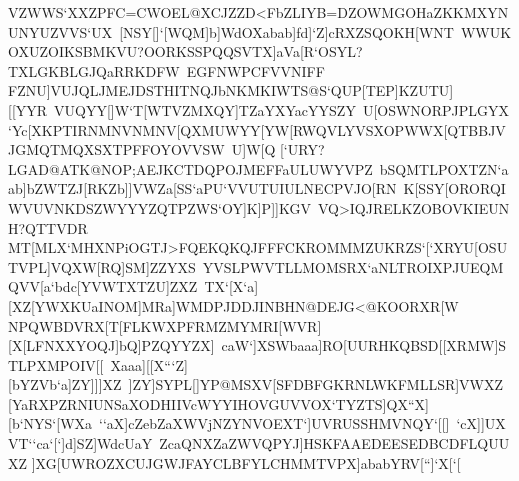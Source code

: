 {{ \hbox{VZWWS`XXZPFC=CWOEL@XCJZZD<FbZLIYB=DZOWMGOHaZKKMXYNUNYUZVVS`UX%
 [NSY[]`[WQM]b]WdOXabab]fd]`Z]cRXZSQOKH[WNT%
 WWUKOXUZOIKSBMKVU?OORKSSPQQSVTX]aVa[R`OSYL?TXLGKBLGJQaRRKDFW%
 EGFNWPCFVVNIFF}
 \hbox{FZNU]VUJQLJMEJDSTHITNQJbNKMKIWTS@S`QUP[TEP]KZUTU][[YYR%
 VUQYY[]W`T[WTVZMXQY]TZaYXYacYYSZY%
 U[OSWNORPJPLGYX`Yc[XKPTIRNMNVNMNV[QXMUWYY[YW[RWQVLYVSXOPWWX[QTBBJVJGMQTMQXSXTPFFOYOVVSW%
 U]W[Q}
 \hbox{[`URY?LGAD@ATK@NOP;AEJKCTDQPOJMEFFaULUWYVPZ%
 bSQMTLPOXTZN`aab]bZWTZJ[RKZb]]VWZa[SS`aPU`VVUTUIULNECPVJO[RN%
 K[SSY[ORORQIWVUVNKDSZWYYYZQTPZWS`OY]K]P]]KGV%
 VQ>IQJRELKZOBOVKIEUNH?QTTVDR}
 \hbox{MT[MLX`MHXNPiOGTJ>FQEKQKQJFFFCKROMMMZUKRZS`[`XRYU[OSUTVPL]VQXW[RQ]SM]ZZYXS%
 YVSLPWVTLLMOMSRX`aNLTROIXPJUEQMQVV[a`bdc[YVWTXTZU]ZXZ%
 TX`[X`a][XZ[YWXKUaINOM]MRa]WMDPJDDJINBHN@DEJG<@KOORXR[W}
 \hbox{NPQWBDVRX[T[FLKWXPFRMZMYMRI[WVR][X[LFNXXYOQJ]bQ]PZQYYZX]%
 caW`]XSWbaaa]RO[UURHKQBSD[[XRMW]STLPXMPOIV[[%
 Xaaa][[X```Z][bYZVb`a]ZY]]]XZ%
 ]ZY]SYPL[]YP@MSXV[SFDBFGKRNLWKFMLLSR]VWXZ}
 \hbox{[YaRXPZRNIUNSaXODHIIVcWYYIHOVGUVVOX`TYZTS]QX``X][b`NYS`[WXa%
 ``aX]cZebZaXWVjNZYNVOEXT`]UVRUSSHMVNQY`[[]%
 `cX]]UXVT``ca`[`]d]SZ]WdcUaY%
 ZcaQNXZaZWVQPYJ]HSKFAAEDEESEDBCDFLQUUXZ}
 \hbox{]XG[UWROZXCUJGWJFAYCLBFYLCHMMTVPX]ababYRV[``]`X[`[%
}}}
